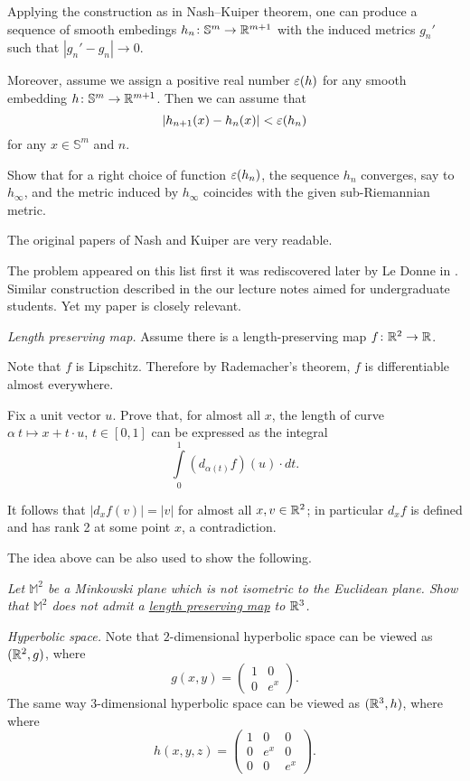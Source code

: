 Applying the construction as in Nash--Kuiper theorem,
one can produce a sequence of smooth embedings $h_n\colon\mathbb{S}^m\to \mathbb{R}^{m+1}$ with the induced metrics $g_n'$
such that $|g_n'-g_n|\to 0$.

Moreover, assume we assign a positive real number $\varepsilon(h)$ for any smooth embedding $h\colon\mathbb{S}^m\to\mathbb{R}^{m+1}$.
Then we can assume that 
\[|h_{n+1}(x)-h_n(x)|<\varepsilon(h_n)\] for any $x\in \mathbb{S}^m$ and $n$.

Show that for a right choice of function $\varepsilon(h_n)$,
the sequence $h_n$ converges, say to $h_\infty$, 
and the metric induced by $h_\infty$ coincides with the given sub-Riemannian metric.

The original papers of Nash \cite{nash} and Kuiper \cite{kuiper} are very readable.

The problem appeared 
on this list first it was rediscovered later by Le Donne in \cite{le-donne}.
Similar construction described in the our lecture notes \cite{petrunin-yashinsky} 
aimed for undergraduate students. 
Yet my paper \cite{petrunin-paths} is closely relevant.

\textit{Length preserving map.}
Assume there is a length-preserving map $f\colon\mathbb{R}^2\to \mathbb{R}$.

Note that $f$ is Lipschitz.
Therefore by Rademacher's theorem, $f$ is differentiable almost everywhere.

Fix a unit vector $u$.
Prove that, for almost all $x$, the length of curve 
$\alpha\:t\mapsto x+t\cdot u$, $t\in[0,1]$ can be expressed as the integral
\[\int\limits_0^1 (d_{\alpha(t)}f)(u) \cdot dt.\]

It follows that $|d_xf(v)|=|v|$ for almost all $x,v\in\mathbb{R}^2$;
in particular $d_xf$ is defined and has rank 2 at some point $x$, a contradiction.  

 The idea above can be also used to show the following.

\textit{Let $\mathbb M^2$ be a \emph{Minkowski plane} which is not isometric to the Euclidean plane.
Show that $\mathbb M^2$ does not admit a \hyperref[Length preserving map]{\emph{length preserving map}} to $\mathbb{R}^3$.}



\textit{Hyperbolic space.}
Note that $2$-dimensional hyperbolic space 
can be viewed as $(\mathbb{R}^2,g)$, where 
\[g(x,y)=\left(\begin{matrix}
     1&0
     \\
     0&e^{x}
    \end{matrix}\right).\]
The same way $3$-dimensional hyperbolic space 
can be viewed as $(\mathbb{R}^3,h)$, where 
where 
\[h(x,y,z)=\left(\begin{matrix}
     1&0&0
     \\
     0&e^{x}&0
     \\
     0&0&e^{x}
    \end{matrix}\right).\]


